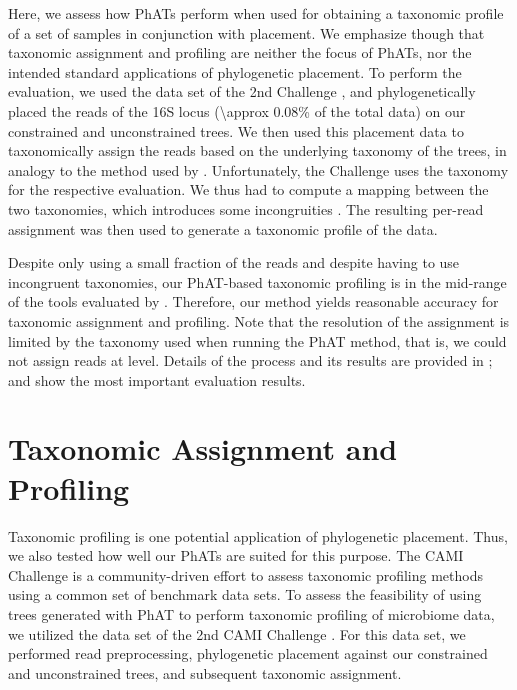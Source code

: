 Here, we assess how \acp{PhAT} perform when used for obtaining a taxonomic profile of a set of samples in conjunction with placement.
We emphasize though that taxonomic assignment and profiling are neither the focus of \acp{PhAT},
nor the intended standard applications of phylogenetic placement.
To perform the evaluation,
we used the  data set of the 2nd  Challenge \citep{Sczyrba2017,Bremges2018},
and phylogenetically placed the reads of the  16S locus (\num{\approx 0.08}\% of the total data)
on our constrained and unconstrained  trees.
We then used this placement data to taxonomically assign the reads
based on the underlying  taxonomy of the trees,
in analogy to the method used by  \citep{Kozlov2016}.
Unfortunately, the  Challenge uses the  taxonomy for the respective evaluation.
We thus had to compute a mapping between the two taxonomies, which introduces some incongruities \citep{Balvociute2017}.
The resulting per-read assignment was then used to generate a taxonomic profile of the data.

Despite only using a small fraction of the reads and despite having to use incongruent taxonomies,
our PhAT-based taxonomic profiling is in the mid-range of the tools evaluated by .
Therefore, our method yields reasonable accuracy for taxonomic assignment and profiling.
Note that the resolution of the assignment is limited by the taxonomy used when running the \ac{PhAT} method,
that is, we could not assign reads at  level.
Details of the process and its results are provided in ;
 and  show the most important evaluation results.


\section{Taxonomic Assignment and Profiling}
\label{sec:Results:sub:TaxonomicAssignmentProfilingDetails}

Taxonomic profiling is one potential application of phylogenetic placement.
Thus, we also tested how well our \acp{PhAT} are suited for this purpose.
The CAMI Challenge \citep{Sczyrba2017} is a community-driven effort to assess taxonomic profiling methods
using a common set of benchmark data sets.
To assess the feasibility of using trees generated with \ac{PhAT} to perform taxonomic profiling of microbiome data,
we utilized the  data set of the 2nd CAMI Challenge \citep{Bremges2018}.
For this data set, we performed read preprocessing, phylogenetic placement
against our constrained and unconstrained  trees,
and subsequent taxonomic assignment.

